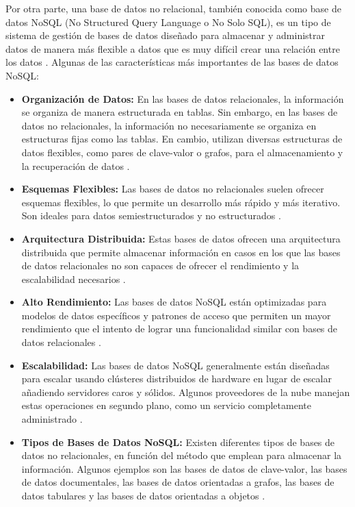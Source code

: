 Por otra parte, una base de datos no relacional, también conocida como base de datos NoSQL (No Structured Query Language o No Solo SQL), es un tipo de sistema de gestión de bases de datos diseñado para almacenar y administrar datos de manera más flexible a datos que es muy difícil crear una relación entre los datos \cite{base5}. Algunas de las características más importantes de las bases de datos NoSQL:

\begin{itemize}
    \item \textbf{Organización de Datos:} En las bases de datos relacionales, la información se organiza de manera estructurada en tablas. Sin embargo, en las bases de datos no relacionales, la información no necesariamente se organiza en estructuras fijas como las tablas. En cambio, utilizan diversas estructuras de datos flexibles, como pares de clave-valor o grafos, para el almacenamiento y la recuperación de datos \cite{nbase2} \cite{nbase3}.

\item \textbf{Esquemas Flexibles:} Las bases de datos no relacionales suelen ofrecer esquemas flexibles, lo que permite un desarrollo más rápido y más iterativo. Son ideales para datos semiestructurados y no estructurados \cite{nbase4}.

\item \textbf{Arquitectura Distribuida:} Estas bases de datos ofrecen una arquitectura distribuida que permite almacenar información en casos en los que las bases de datos relacionales no son capaces de ofrecer el rendimiento y la escalabilidad necesarios \cite{nbase3}.

\item \textbf{Alto Rendimiento:} Las bases de datos NoSQL están optimizadas para modelos de datos específicos y patrones de acceso que permiten un mayor rendimiento que el intento de lograr una funcionalidad similar con bases de datos relacionales \cite{nbase4}.

\item \textbf{Escalabilidad:} Las bases de datos NoSQL generalmente están diseñadas para escalar usando clústeres distribuidos de hardware en lugar de escalar añadiendo servidores caros y sólidos. Algunos proveedores de la nube manejan estas operaciones en segundo plano, como un servicio completamente administrado \cite{nbase4}.

\item \textbf{Tipos de Bases de Datos NoSQL:} Existen diferentes tipos de bases de datos no relacionales, en función del método que emplean para almacenar la información. Algunos ejemplos son las bases de datos de clave-valor, las bases de datos documentales, las bases de datos orientadas a grafos, las bases de datos tabulares y las bases de datos orientadas a objetos \cite{nbase3}.


\end{itemize}
